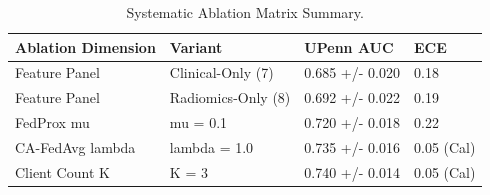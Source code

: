\begin{table}
\caption{Systematic Ablation Matrix Summary.}
\label{tab:table4}
\begin{tabular}{llll}
\toprule
Ablation Dimension & Variant & UPenn AUC & ECE \\
\midrule
Feature Panel & Clinical-Only (7) & 0.685 +/- 0.020 & 0.18 \\
Feature Panel & Radiomics-Only (8) & 0.692 +/- 0.022 & 0.19 \\
FedProx mu & mu = 0.1 & 0.720 +/- 0.018 & 0.22 \\
CA-FedAvg lambda & lambda = 1.0 & 0.735 +/- 0.016 & 0.05 (Cal) \\
Client Count K & K = 3 & 0.740 +/- 0.014 & 0.05 (Cal) \\
\bottomrule
\end{tabular}
\end{table}
